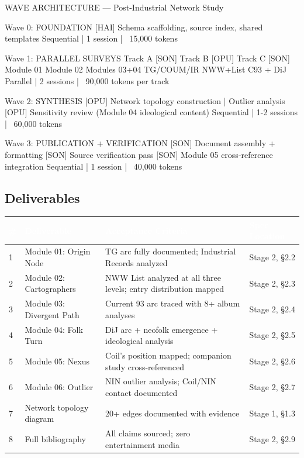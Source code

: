\documentclass[11pt,letterpaper]{article}
\newcommand{\tableheader}[1]{\textbf{\sffamily\textcolor{white}{#1}}}
\begin{document}
\begin{asciibox}
WAVE ARCHITECTURE — Post-Industrial Network Study

Wave 0: FOUNDATION
  [HAI] Schema scaffolding, source index, shared templates
  Sequential | 1 session | ~15,000 tokens

Wave 1: PARALLEL SURVEYS
  Track A [SON]  Track B [OPU]   Track C [SON]
  Module 01      Module 02       Modules 03+04
  TG/COUM/IR     NWW+List        C93 + DiJ
  Parallel | 2 sessions | ~90,000 tokens per track

Wave 2: SYNTHESIS
  [OPU] Network topology construction | Outlier analysis
  [OPU] Sensitivity review (Module 04 ideological content)
  Sequential | 1-2 sessions | ~60,000 tokens

Wave 3: PUBLICATION + VERIFICATION
  [SON] Document assembly + formatting
  [SON] Source verification pass
  [SON] Module 05 cross-reference integration
  Sequential | 1 session | ~40,000 tokens
\end{asciibox}

\subsection{Deliverables}

\begin{center}
\begin{tabularx}{\textwidth}{C{0.5cm}L{4cm}L{4cm}X}
\toprule
{}
\tableheader{\#} & \tableheader{Deliverable} & \tableheader{Acceptance Criteria} & \tableheader{Spec Location} \\
 & Module 01: Origin Node & TG arc fully documented; Industrial Records analyzed & Stage 2, \S2.2 \\
2 & Module 02: Cartographers & NWW List analyzed at all three levels; entry distribution mapped & Stage 2, \S2.3 \\
3 & Module 03: Divergent Path & Current 93 arc traced with 8+ album analyses & Stage 2, \S2.4 \\
4 & Module 04: Folk Turn & DiJ arc + neofolk emergence + ideological analysis & Stage 2, \S2.5 \\
5 & Module 05: Nexus & Coil's position mapped; companion study cross-referenced & Stage 2, \S2.6 \\
6 & Module 06: Outlier & NIN outlier analysis; Coil/NIN contact documented & Stage 2, \S2.7 \\
7 & Network topology diagram & 20+ edges documented with evidence & Stage 1, \S1.3 \\
8 & Full bibliography & All claims sourced; zero entertainment media & Stage 2, \S2.9 \\
\bottomrule
\end{tabularx}
\end{center}
\end{document}
